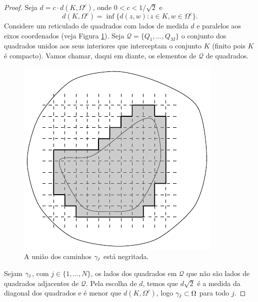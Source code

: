     \begin{proof}
        Seja $d = c \cdot d(K, \Omega^c)$, onde $0 < c < 1/\sqrt{2}$ e
        \begin{equation*}
        d(K, \Omega^c) = \inf \{d(z,w) : z \in K, w \in \Omega^c\}.
        \end{equation*}
        Considere um reticulado de quadrados com lados de medida $d$ e paralelos aos eixos 
        coordenados (veja Figura \ref{fig:reticulado runge}). Seja $\mathcal{Q} = \{Q_1, \dots, Q_M\}$ o conjunto 
        dos quadrados unidos aos seus interiores que interceptam o conjunto $K$ (finito pois
        $K$ é compacto). Vamos chamar, daqui em diante, os elementos de $\mathcal{Q}$ de quadrados.
        \begin{figure}[H]\centering
            \includegraphics{
                Figuras/reticulado-para-Runge.pdf
            }
        	\caption{A união dos caminhos $\gamma_j$ está negritada.}
        	\label{fig:reticulado runge}
        \end{figure}
        Sejam $\gamma_j$, com $j \in \{1, \dots, N\}$, os lados dos quadrados em $\mathcal{Q}$ 
        que não são lados de quadrados adjacentes de $\mathcal{Q}$. Pela escolha de $d$, temos 
        que $d\sqrt{2}$ é a medida da diagonal dos quadrados e é menor que $d(K, \Omega^c)$, 
        logo $\gamma_j\subset\Omega$ para todo $j$.
        

\end{proof}
